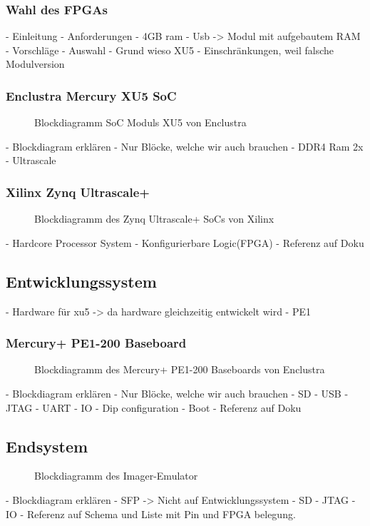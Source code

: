 \documentclass{article}
\begin{document}
\subsubsection*{Wahl des FPGAs}
- Einleitung
- Anforderungen
    - 4GB ram
    - Usb
    -> Modul mit aufgebautem RAM
- Vorschläge
- Auswahl
    - Grund wieso XU5
    - Einschränkungen, weil falsche Modulversion
\subsubsection*{Enclustra Mercury XU5 SoC}
\begin{figure}[tb]
    \caption{Blockdiagramm SoC Moduls XU5 von Enclustra}
    \label{fig:bd_xu5}
\end{figure}
- Blockdiagram erklären
    - Nur Blöcke, welche wir auch brauchen
    - DDR4 Ram 2x
    - Ultrascale

\subsubsection*{Xilinx Zynq Ultrascale+}
\begin{figure}[tb]
    \caption{Blockdiagramm des Zynq Ultrascale+ SoCs von Xilinx}
    \label{fig:bd_soc}
\end{figure}
- Hardcore Processor System
- Konfigurierbare Logic(FPGA)
- Referenz auf Doku

\subsection{Entwicklungssystem}
- Hardware für xu5 
    -> da hardware gleichzeitig entwickelt wird
    - PE1

\subsubsection*{Mercury+ PE1-200 Baseboard}
\begin{figure}[tb]
    \caption{Blockdiagramm des Mercury+ PE1-200 Baseboards von Enclustra}
    \label{fig:bd_pe1}
\end{figure}

- Blockdiagram erklären
    - Nur Blöcke, welche wir auch brauchen
    - SD
    - USB
    - JTAG
    - UART
    - IO
        - Dip configuration
            - Boot
- Referenz auf Doku


\subsection{Endsystem}
\begin{figure}[tb]
    \caption{Blockdiagramm des Imager-Emulator}
    \label{fig:bd_top}
\end{figure}
- Blockdiagram erklären
    - SFP
    -> Nicht auf Entwicklungssystem
    - SD
    - JTAG
    - IO
- Referenz auf Schema und Liste mit Pin und FPGA belegung.
\end{document}
